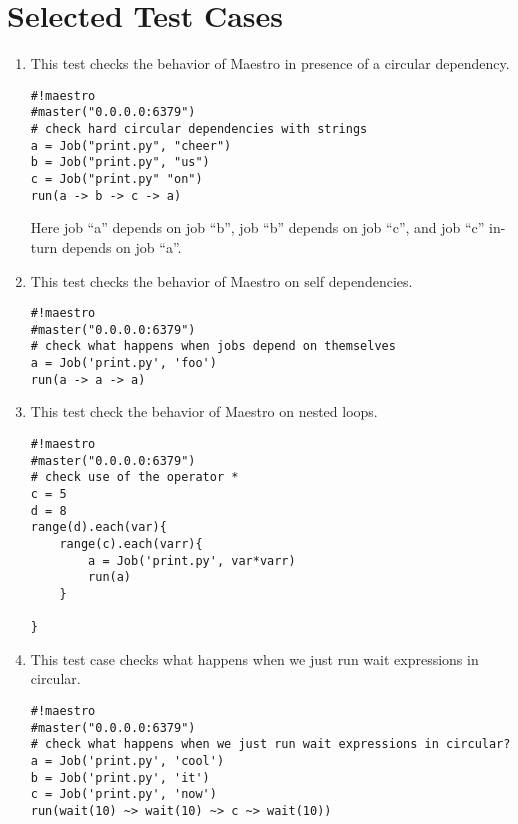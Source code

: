 \section{Selected Test Cases}
\begin{enumerate}

\item This test checks the behavior of Maestro in presence of a circular
dependency.
\begin{verbatim}
#!maestro
#master("0.0.0.0:6379")
# check hard circular dependencies with strings
a = Job("print.py", "cheer")
b = Job("print.py", "us")
c = Job("print.py" "on")
run(a -> b -> c -> a)
\end{verbatim}
Here job ``a'' depends on job ``b'', job ``b'' depends on job ``c'', and job
``c'' in-turn depends on job ``a''.

\item This test checks the behavior of Maestro on self dependencies.
\begin{verbatim}
#!maestro
#master("0.0.0.0:6379")
# check what happens when jobs depend on themselves
a = Job('print.py', 'foo')
run(a -> a -> a)
\end{verbatim}
\newpage
\noindent \item This test check the behavior of Maestro on nested loops.
\begin{verbatim}
#!maestro
#master("0.0.0.0:6379")
# check use of the operator *
c = 5
d = 8
range(d).each(var){
	range(c).each(varr){
		a = Job('print.py', var*varr)
		run(a)
	}

}
\end{verbatim}

\item This test case checks what happens when we just run wait expressions in
circular.
\begin{verbatim}
#!maestro
#master("0.0.0.0:6379")
# check what happens when we just run wait expressions in circular?
a = Job('print.py', 'cool')
b = Job('print.py', 'it')
c = Job('print.py', 'now')
run(wait(10) ~> wait(10) ~> c ~> wait(10))
\end{verbatim}

\end{enumerate}
